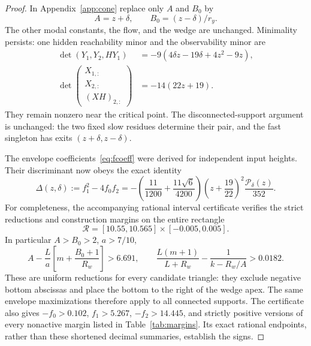 \begin{proof}
In Appendix~\ref{app:cone} replace only $A$ and $B_0$ by
\begin{equation}
 A=z+\delta,\qquad B_0=(z-\delta)/r_y.
\end{equation}
The other modal constants, the flow, and the wedge are unchanged.
Minimality persists: one hidden reachability minor and the observability
minor are
\begin{align}
 \det(Y_1,Y_2,HY_1)&=-9(4\delta z-19\delta+4z^2-9z),\\
 \det\begin{pmatrix}X_{1,:}\\X_{2,:}\\(XH)_{2,:}\end{pmatrix}
 &=-14(22z+19).
\end{align}
They remain nonzero near the critical point.  The disconnected-support
argument is unchanged: the two fixed slow residues determine their pair,
and the fast singleton has exits $(z+\delta,z-\delta)$.

The envelope coefficients~\eqref{eq:fcoeff} were derived for independent
input heights.  Their discriminant now obeys the exact identity
\begin{equation}
 \Delta(z,\delta):=f_1^2-4f_0f_2
 =-\left(\frac{11}{1200}+\frac{11\sqrt6}{4200}\right)
 \left(z+\frac{19}{22}\right)^2\frac{\mathcal P_\delta(z)}{352}.
 \label{eq:perturbeddisc}
\end{equation}
For completeness, the accompanying rational interval certificate verifies
the strict reductions and construction margins on the entire rectangle
\begin{equation}
 \mathcal R=[10.55,10.565]\times[-0.005,0.005].\label{eq:unfoldrect}
\end{equation}
In particular $A>B_0>2$, $a>7/10$,
\begin{equation}
 A-\frac{L}{a}\left[m+\frac{B_0+1}{R_w}\right]>6.691,
 \qquad
 \frac{L(m+1)}{L+R_w}-\frac1{k-R_w/A}>0.0182.
\end{equation}
These are uniform reductions for every candidate triangle: they exclude
negative bottom abscissas and place the bottom to the right of the wedge
apex.  The same envelope maximizations therefore apply to all connected
supports.  The certificate also gives $-f_0>0.102$, $f_1>5.267$,
$-f_2>14.445$, and strictly positive versions of every nonactive margin
listed in Table~\ref{tab:margins}.  Its exact rational endpoints, rather
than these shortened decimal summaries, establish the signs.


\end{proof}
